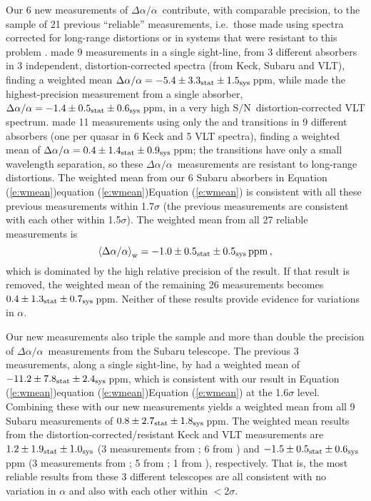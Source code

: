 \documentclass[fleqn,usenatbib,usedcolumn]{mnras}
\newcommand{\Eref}[1]{\ifhmode \ifnum\spacefactor=1001 Equation (\ref{#1})\else equation (\ref{#1})\fi \else Equation (\ref{#1})\fi}
\newcommand{\SN}{\ensuremath{\textrm{S/N}}}
\newcommand{\daa}{\ensuremath{\Delta\alpha/\alpha}}
\begin{document}
Our 6 new measurements of \daa\ contribute, with comparable precision, to the sample of 21 previous ``reliable'' measurements, i.e.\ those made using spectra corrected for long-range distortions \citep{Evans:2014:128,Kotus:2017:3679} or in systems that were resistant to this problem \citep{Murphy:2016:2461}. \citeauthor{Evans:2014:128} made 9 measurements in a single sight-line, from 3 different absorbers in 3 independent, distortion-corrected spectra (from Keck, Subaru and VLT), finding a weighted mean $\daa=-5.4\pm3.3_{\rm stat}\pm1.5_{\rm sys}$\,ppm, while \citeauthor{Kotus:2017:3679} made the highest-precision measurement from a single absorber, $\daa=-1.4\pm0.5_{\rm stat}\pm0.6_{\rm sys}$\,ppm, in a very high \SN\ distortion-corrected VLT spectrum. \citeauthor{Murphy:2016:2461} made 11 measurements using only the  and  transitions in 9 different absorbers (one per quasar in 6 Keck and 5 VLT spectra), finding a weighted mean of $\daa=0.4\pm1.4_{\rm stat}\pm0.9_{\rm sys}$\,ppm; the  transitions have only a small wavelength separation, so these \daa\ measurements are resistant to long-range distortions. The weighted mean from our 6 Subaru absorbers in \Eref{e:wmean} is consistent with all these previous measurements within 1.7$\sigma$ (the previous measurements are consistent with each other within 1.5$\sigma$). The weighted mean from all 27 reliable measurements is
\begin{equation}\label{e:all}
\left<\daa\right>_{\rm w} = -1.0 \pm 0.5_{\rm stat} \pm 0.5_{\rm sys}\,{\rm ppm}\,,
\end{equation}
which is dominated by the high relative precision of the \citeauthor{Kotus:2017:3679} result. If that result is removed, the weighted mean of the remaining 26 measurements becomes $0.4\pm1.3_{\rm stat}\pm0.7_{\rm sys}$\,ppm. Neither of these results provide evidence for variations in $\alpha$.

Our new measurements also triple the sample and more than double the precision of \daa\ measurements from the Subaru telescope. The previous 3 measurements, along a single sight-line, by \citet{Evans:2014:128} had a weighted mean of $-11.2\pm7.8_{\rm stat}\pm2.4_{\rm sys}$\,ppm, which is consistent with our result in \Eref{e:wmean} at the 1.6$\sigma$ level. Combining these with our new measurements yields a weighted mean from all 9 Subaru measurements of $0.8\pm2.7_{\rm stat}\pm1.8_{\rm sys}$\,ppm. The weighted mean results from the distortion-corrected/resistant Keck and VLT measurements are $1.2\pm1.9_{\rm stat}\pm1.0_{\rm sys}$ (3 measurements from \citeauthor{Evans:2014:128}; 6 from \citeauthor{Murphy:2016:2461}) and $-1.5\pm0.5_{\rm stat}\pm0.6_{\rm sys}$\,ppm (3 measurements from \citeauthor{Evans:2014:128}; 5 from \citeauthor{Murphy:2016:2461}; 1 from \citeauthor{Kotus:2017:3679}), respectively. That is, the most reliable results from these 3 different telescopes are all consistent with no variation in $\alpha$ and also with each other within $<$2$\sigma$.
\end{document}
